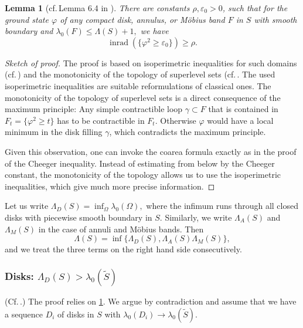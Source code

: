\documentclass[a4paper,11pt]{amsart}
\numberwithin{equation}{section}
\newtheorem{lem}[equation]{Lemma}
\theoremstyle{definition}
\def\ve{\varepsilon}
\DeclareMathOperator{\inrad}{inrad}
\begin{document}
\begin{lem}[cf.\,Lemma 6.4 in \cite{BMM3}]\label{cheet}
There are constants $\rho, \ve_0>0$, such that for the ground state $\varphi$ of any compact disk, annulus, or M\"obius band $F$ in $S$ with smooth boundary and $\lambda_0(F)\leq \Lambda(S)+1,$ we have
\begin{equation*}
\inrad(\{\varphi^2 \geq \ve_0\}) \geq \rho.
\end{equation*}
\end{lem}

\begin{proof}[Sketch of proof]
The proof is based on isoperimetric inequalities for such domains (cf.\,\cite[Corollary 2.2]{BMM3}) and the monotonicity of the topology of superlevel sets (cf.\,\cite[Proposition 5.2]{BMM3}.
The used isoperimetric inequalities are suitable reformulations of classical ones.
The monotonicity of the topology of superlevel sets is a direct consequence of the maximum principle:
Any simple contractible loop $\gamma \subset F$ that is contained in $F_t=\{\varphi^2 \geq t\}$ has to be contractible in $F_t$.
Otherwise $\varphi$ would have a local minimum in the disk filling $\gamma$, which
contradicts the maximum principle.

Given this observation, one can invoke the coarea formula exactly as in the proof of the Cheeger inequality.
Instead of estimating from below by the Cheeger constant, the monotonicity of the topology allows us
 to use the isoperimetric inequalities, which give much more precise information.
\end{proof}
 
Let us write $\Lambda_D(S)=\inf_\Omega \lambda_0(\Omega),$ where the infimum runs through
all closed disks with piecewise smooth boundary in $S.$
Similarly, we write $\Lambda_A(S)$ and $\Lambda_{M}(S)$ in the case of annuli and M\"obius bands.
Then
\begin{equation*}
  \Lambda(S) = \inf\{\Lambda_D(S),\Lambda_A(S)\Lambda_M(S)\},
\end{equation*}
and we treat the three terms on the right hand side consecutively.

\subsubsection{Disks: $\Lambda_D(S)>\lambda_0(\tilde S)$}
(Cf.\,\cite[Theorem 7.2]{BMM3}.)
The proof relies on \cref{cheet}.
We argue by contradiction and assume that we have a sequence $D_i$ of disks in $S$ with $\lambda_0(D_i) \to \lambda_0(\tilde S).$
\end{document}
